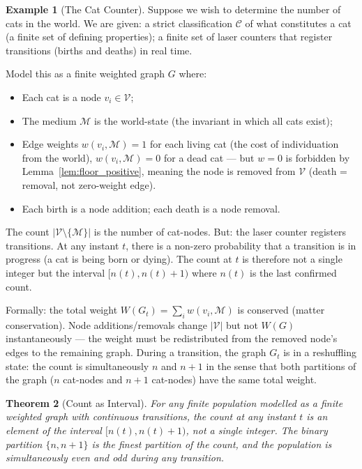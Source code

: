 \documentclass[12pt, a4paper]{article}
\theoremstyle{plain}
\newtheorem{theorem}{Theorem}[section]
\theoremstyle{definition}
\newtheorem{example}[theorem]{Example}
\theoremstyle{remark}
\newcommand{\med}{\mathcal{M}}
\newcommand{\Vcal}{\mathcal{V}}
\begin{document}
\begin{example}[The Cat Counter]
\label{ex:cats}
Suppose we wish to determine the number of cats in the world. We are given:
a strict classification $\mathcal{C}$ of what constitutes a cat (a finite
set of defining properties); a finite set of laser counters that register
transitions (births and deaths) in real time.

Model this as a finite weighted graph $G$ where:
\begin{itemize}
  \item Each cat is a node $v_i \in \Vcal$;
  \item The medium $\med$ is the world-state (the invariant in which all
  cats exist);
  \item Edge weights $w(v_i, \med) = 1$ for each living cat (the cost of
  individuation from the world), $w(v_i, \med) = 0$ for a dead cat --- but
  $w = 0$ is forbidden by Lemma~\ref{lem:floor_positive}, meaning the node
  is removed from $\Vcal$ (death = removal, not zero-weight edge).
  \item Each birth is a node addition; each death is a node removal.
\end{itemize}

The count $|\Vcal \setminus \{\med\}|$ is the number of cat-nodes. But:
the laser counter registers transitions. At any instant $t$, there is a
non-zero probability that a transition is in progress (a cat is being born
or dying). The count at $t$ is therefore not a single integer but the
interval $[n(t), n(t)+1)$ where $n(t)$ is the last confirmed count.

Formally: the total weight $W(G_t) = \sum_i w(v_i, \med)$ is conserved
(matter conservation). Node additions/removals change $|\Vcal|$ but not
$W(G)$ instantaneously --- the weight must be redistributed from the
removed node's edges to the remaining graph. During a transition, the
graph $G_t$ is in a reshuffling state: the count is simultaneously $n$ and
$n+1$ in the sense that both partitions of the graph ($n$ cat-nodes and
$n+1$ cat-nodes) have the same total weight.
\end{example}

\begin{theorem}[Count as Interval]
\label{thm:count_interval}
For any finite population modelled as a finite weighted graph with continuous
transitions, the count at any instant $t$ is an element of the interval
$[n(t), n(t)+1)$, not a single integer. The binary partition
$\{n, n+1\}$ is the finest partition of the count, and the population is
simultaneously even and odd during any transition.
\end{theorem}
\end{document}
